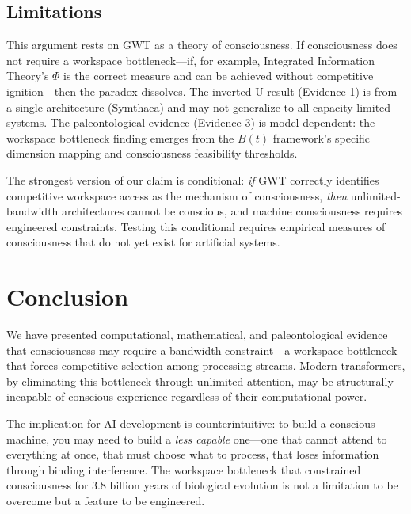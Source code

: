 \documentclass[10pt,letterpaper]{article}
\begin{document}
\subsection*{Limitations}

This argument rests on GWT as a theory of consciousness. If consciousness
does not require a workspace bottleneck---if, for example, Integrated
Information Theory's $\Phi$ is the correct measure and can be achieved
without competitive ignition---then the paradox dissolves. The inverted-U
result (Evidence 1) is from a single architecture (Symthaea) and may not
generalize to all capacity-limited systems. The paleontological evidence
(Evidence 3) is model-dependent: the workspace bottleneck finding emerges
from the $B(t)$ framework's specific dimension mapping and consciousness
feasibility thresholds.

The strongest version of our claim is conditional: \emph{if} GWT
correctly identifies competitive workspace access as the mechanism of
consciousness, \emph{then} unlimited-bandwidth architectures cannot be
conscious, and machine consciousness requires engineered constraints.
Testing this conditional requires empirical measures of consciousness
that do not yet exist for artificial systems.

\section*{Conclusion}

We have presented computational, mathematical, and paleontological
evidence that consciousness may require a bandwidth constraint---a
workspace bottleneck that forces competitive selection among processing
streams. Modern transformers, by eliminating this bottleneck through
unlimited attention, may be structurally incapable of conscious
experience regardless of their computational power.

The implication for AI development is counterintuitive: to build a
conscious machine, you may need to build a \emph{less capable} one---one
that cannot attend to everything at once, that must choose what to
process, that loses information through binding interference. The
workspace bottleneck that constrained consciousness for 3.8 billion
years of biological evolution is not a limitation to be overcome but a
feature to be engineered.
\end{document}
